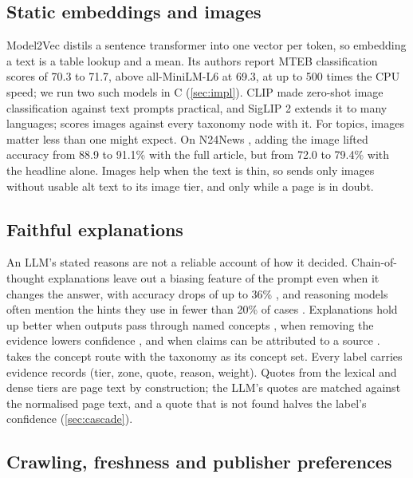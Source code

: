 \subsection{Static embeddings and images}\label{sec:related-emb}

Model2Vec \citep{tulkens2024model2vec} distils a sentence transformer into one vector per token, so embedding a text is a table lookup and a mean. Its authors report MTEB classification scores of 70.3 to 71.7, above all-MiniLM-L6 at 69.3, at up to 500 times the CPU speed; we run two such models in C (\cref{sec:impl}). CLIP \citep{radford2021learning} made zero-shot image classification against text prompts practical, and SigLIP 2 \citep{tschannen2025siglip} extends it to many languages; \sys{} scores images against every taxonomy node with it. For topics, images matter less than one might expect. On N24News \citep{wang2022n24news}, adding the image lifted accuracy from 88.9 to 91.1\% with the full article, but from 72.0 to 79.4\% with the headline alone. Images help when the text is thin, so \sys{} sends only images without usable alt text to its image tier, and only while a page is in doubt.

\subsection{Faithful explanations}\label{sec:related-explain}

An LLM's stated reasons are not a reliable account of how it decided. Chain-of-thought explanations leave out a biasing feature of the prompt even when it changes the answer, with accuracy drops of up to 36\% \citep{turpin2023language}, and reasoning models often mention the hints they use in fewer than 20\% of cases \citep{chen2025reasoning}. Explanations hold up better when outputs pass through named concepts \citep{sun2025concept}, when removing the evidence lowers confidence \citep{deyoung2020eraser}, and when claims can be attributed to a source \citep{rashkin2023measuring}. \sys{} takes the concept route with the taxonomy as its concept set. Every label carries evidence records (tier, zone, quote, reason, weight). Quotes from the lexical and dense tiers are page text by construction; the LLM's quotes are matched against the normalised page text, and a quote that is not found halves the label's confidence (\cref{sec:cascade}).

\subsection{Crawling, freshness and publisher preferences}\label{sec:related-crawl}

